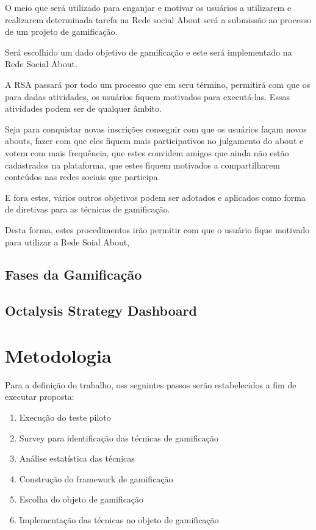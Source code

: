 O meio que será utilizado para enganjar e motivar os usuários a utilizarem e
realizarem determinada tarefa na Rede social About será a submissão ao processo
de um projeto de gamificação. 

Será escolhido um dado objetivo de gamificação e este será implementado na Rede
Social About.

A RSA passará por todo um processo que em seru término, permitirá com que os
para dadas atividades, os usuários fiquem motivados para executá-las. Essas
atividades podem ser de qualquer âmbito. 

Seja para conquistar novas inscrições
conseguir com que os usuários façam novos abouts, fazer com que eles fiquem mais
participativos no julgamento do about e votem com mais frequência, que estes
convidem amigos que ainda não estão cadastrados na plataforma, que estes fiquem
motivados a compartilharem conteúdos nas redes sociais que participa.

E fora
estes, vários outros  objetivos podem ser adotados e aplicados como forma
de diretivas para as técnicas de gamificação.

Desta forma, estes procedimentos irão permitir com que o usuário fique motivado
para utilizar a Rede Soial About,

\subsection{Fases da Gamificação}

\subsection{Octalysis Strategy Dashboard}

\section{Metodologia}
\label{sec:metodologia}

Para a definição do trabalho, oss seguintes
passos serão estabelecidos a fim de executar proposta:

\begin{enumerate}
    \item Execução do teste piloto
    \item Survey para identificação das técnicas de gamificação
    \item Análise estatística das técnicas
    \item Construção do framework de gamificação
    \item Escolha do objeto de gamificação
    \item Implementação das técnicas no objeto de gamificação
\end{enumerate}

